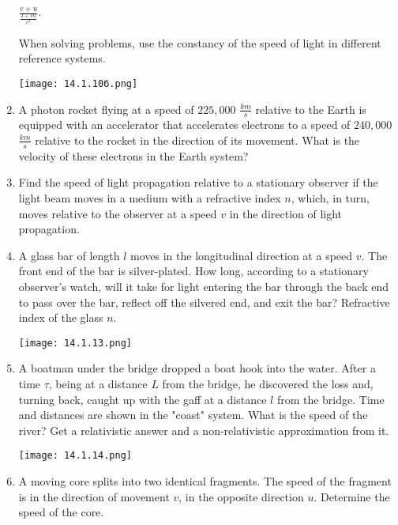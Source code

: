 \documentclass{article}
\begin{document}
\begin{enumerate}[label=14.1.\arabic*]
$\frac{v + u}{\frac{I + vu}{c^2}}$.

When solving problems, use the constancy of the speed of light in different reference systems.

\begin{center}
    \texttt{[image: 14.1.10б.png]}
\end{center}

\item A photon rocket flying at a speed of $225,000$ $\frac{km}{s}$ relative to the Earth is equipped with an accelerator that accelerates electrons to a speed of $240,000$ $\frac{km}{s}$ relative to the rocket in the direction of its movement. What is the velocity of these electrons in the Earth system?

\item Find the speed of light propagation relative to a stationary observer if the light beam moves in a medium with a refractive index $n$, which, in turn, moves relative to the observer at a speed $v$ in the direction of light propagation.

\item A glass bar of length $l$ moves in the longitudinal direction at a speed $v$. The front end of the bar is silver-plated. How long, according to a stationary observer's watch, will it take for light entering the bar through the back end to pass over the bar, reflect off the silvered end, and exit the bar? Refractive index of the glass $n$.

\begin{center}
    \texttt{[image: 14.1.13.png]}
\end{center}

\item A boatman under the bridge dropped a boat hook into the water. After a time $\tau$, being at a distance $L$ from the bridge, he discovered the loss and, turning back, caught up with the gaff at a distance $l$ from the bridge. Time and distances are shown in the "coast" system. What is the speed of the river? Get a relativistic answer and a non-relativistic approximation from it.

\begin{center}
    \texttt{[image: 14.1.14.png]}
\end{center}

\item A moving core splits into two identical fragments. The speed of the fragment is in the direction of movement $v$, in the opposite direction $u$. Determine the speed of the core.


\end{enumerate}
\end{document}

